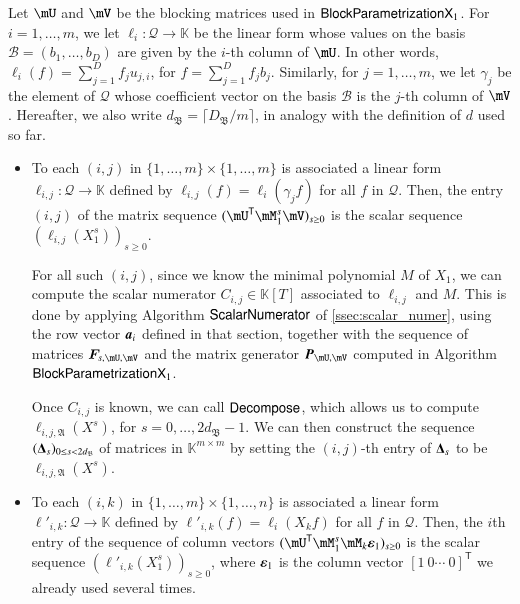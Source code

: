 \documentclass[final,1p,times,authoryear]{elsarticle}
\newcommand{\mat}[1]{\bm{\MakeUppercase{#1}}} %
\newcommand{\row}[1]{\bm{\MakeLowercase{#1}}} %
\newcommand{\col}[1]{\bm{\MakeLowercase{#1}}} %
\newcommand{\seqelt}[1]{\bm{F}_{#1}} %
\newcommand{\basis}{\mathscr{B}}
\newcommand{\mainalgoname}{\mathsf{ BlockParametrization}}
\newcommand{\lf}{X}
\newcommand{\residueI}{\mathscr{Q}}
\newcommand{\trsp}[1]{#1^{\mathsf{T}}} %
\def\K{\mathbb{K}}
\def\K {\ensuremath{\mathbb{K}}}
\newcommand{\mUt}{\trsp{\mU}}
\begin{document}
Let $\mU$ and $\mV$ be the blocking matrices used in
$\mainalgoname{\sf X}_1$. For $i=1,\dots,m$, we let
$\ell_i: \residueI \to \K$ be the linear form whose values on the
basis $\basis=(b_1,\dots,b_D)$ are given by the $i$-th column of
$\mU$. In other words, $\ell_i(f) = \sum_{j=1}^D f_j u_{j,i}$, for
$f=\sum_{j=1}^D f_j b_j$. Similarly, for $j=1,\dots,m$, we let
$\gamma_j$ be the element of $\residueI$ whose coefficient vector on
the basis $\basis$ is the $j$-th column of $\mV$.
Hereafter, we also write $d_\mathfrak{B}=\lceil D_\mathfrak{B}/m \rceil$,
in analogy with the definition of $d$ used so far.
\begin{itemize}
  \item To each $(i,j)$ in $\{1,\dots,m\}\times \{1,\dots,m\}$ is
    associated a linear form $\ell_{i,j}: \residueI\to \K$ defined by
    $\ell_{i,j}(f) =\ell_i(\gamma_j f)$ for all $f$ in $\residueI$.
    Then, the entry $(i,j)$ of the matrix sequence $(\mUt \mM_1^s
    \mV)_{s \ge0}$ is the scalar sequence $(\ell_{i,j}(X_1^s))_{s \ge
    0}$.

    \smallskip

    For all such $(i,j)$, since we know the minimal polynomial $M$ of
    $X_1$, we can compute the scalar numerator $C_{i,j} \in \K[T]$
    associated to $\ell_{i,j}$ and $M$. This is done by applying
    Algorithm $\mathsf{{\sf ScalarNumerator}}$ of
    \cref{ssec:scalar_numer}, using the row vector $\row{a}_i$ defined
    in that section, together with the sequence of matrices
    $\seqelt{s,\mU,\mV}$ and the matrix generator $\mat{P}_{\mU,\mV}$
    computed in Algorithm $\mainalgoname{\sf X}_1$.

    \smallskip

    Once $C_{i,j}$ is known, we can call ${\sf Decompose}$, which allows us
    to compute $\ell_{i,j,\mathfrak{A}}(\lf^s)$, for
    $s=0,\dots,2d_\mathfrak{B}-1$.  We can then construct the sequence
    $(\mat{\Delta}_s)_{0 \le s < 2d_\mathfrak{B}}$ of matrices in
    $\K^{m\times m}$ by setting the $(i,j)$-th entry of $\mat{\Delta}_s$
    to be $\ell_{i,j,\mathfrak{A}}(\lf^s)$.

    \smallskip

  \item To each $(i,k)$ in $\{1,\dots,m\}\times \{1,\dots,n\}$ is
    associated a linear form $\ell'_{i,k}: \residueI\to \K$ defined by
    $\ell'_{i,k}(f) =\ell_i(X_k f)$ for all $f$ in $\residueI$.  Then,
    the $i$th entry of the sequence of column vectors $(\mUt
    \mM_1^s \mM_k \col{\varepsilon}_1)_{s \ge0}$ is the scalar sequence
    $(\ell'_{i,k}(X_1^s))_{s \ge 0}$, where $\col{\varepsilon}_1$ is the
    column vector $\trsp{[1~0\cdots~0]}$ we already used several times.


\end{itemize}
\end{document}
